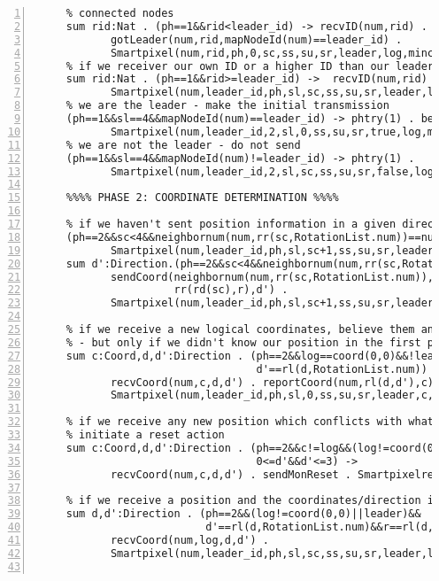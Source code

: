 \begin{Verbatim}[frame=lines,numbers=left,fontfamily=courier,fontsize=\footnotesize]
     % if we receive a lower ID than our leader ID, honor it - and retransmit it to the
     % connected nodes
     sum rid:Nat . (ph==1&&rid<leader_id) -> recvID(num,rid) .
            gotLeader(num,rid,mapNodeId(num)==leader_id) .
            Smartpixel(num,rid,ph,0,sc,ss,su,sr,leader,log,mincd,maxcd,f,r,rc) +
     % if we receiver our own ID or a higher ID than our leader id, do nothing
     sum rid:Nat . (ph==1&&rid>=leader_id) ->  recvID(num,rid) .
            Smartpixel(num,leader_id,ph,sl,sc,ss,su,sr,leader,log,mincd,maxcd,f,r,rc) +
     % we are the leader - make the initial transmission
     (ph==1&&sl==4&&mapNodeId(num)==leader_id) -> phtry(1) . becomeLeader(num) .
            Smartpixel(num,leader_id,2,sl,0,ss,su,sr,true,log,mincd,maxcd,f,r,rc) +
     % we are not the leader - do not send
     (ph==1&&sl==4&&mapNodeId(num)!=leader_id) -> phtry(1) .
            Smartpixel(num,leader_id,2,sl,sc,ss,su,sr,false,log,mincd,maxcd,f,r,rc) +

     %%%% PHASE 2: COORDINATE DETERMINATION %%%%

     % if we haven't sent position information in a given direction, do so
     (ph==2&&sc<4&&neighbornum(num,rr(sc,RotationList.num))==num) -> intern .
            Smartpixel(num,leader_id,ph,sl,sc+1,ss,su,sr,leader,log,mincd,maxcd,f,r,rc) +
     sum d':Direction.(ph==2&&sc<4&&neighbornum(num,rr(sc,RotationList.num))!=num) ->
            sendCoord(neighbornum(num,rr(sc,RotationList.num)),move(rr(sc,r),log),
                      rr(rd(sc),r),d') .
            Smartpixel(num,leader_id,ph,sl,sc+1,ss,su,sr,leader,log,mincd,maxcd,f,r,rc) +

     % if we receive a new logical coordinates, believe them and update accordingly
     % - but only if we didn't know our position in the first place
     sum c:Coord,d,d':Direction . (ph==2&&log==coord(0,0)&&!leader&&
                                   d'==rl(d,RotationList.num)) ->
            recvCoord(num,c,d,d') . reportCoord(num,rl(d,d'),c) .
            Smartpixel(num,leader_id,ph,sl,0,ss,su,sr,leader,c,c,c,f,rl(d,d'),rc) +
 
     % if we receive any new position which conflicts with what we already have,
     % initiate a reset action
     sum c:Coord,d,d':Direction . (ph==2&&c!=log&&(log!=coord(0,0)||leader)&&
                                   0<=d'&&d'<=3) ->
            recvCoord(num,c,d,d') . sendMonReset . Smartpixelreset(num,rc) +

     % if we receive a position and the coordinates/direction is ok, ignore it
     sum d,d':Direction . (ph==2&&(log!=coord(0,0)||leader)&&
                           d'==rl(d,RotationList.num)&&r==rl(d,d')) ->
            recvCoord(num,log,d,d') .
            Smartpixel(num,leader_id,ph,sl,sc,ss,su,sr,leader,log,mincd,maxcd,f,r,rc) +


\end{Verbatim}
